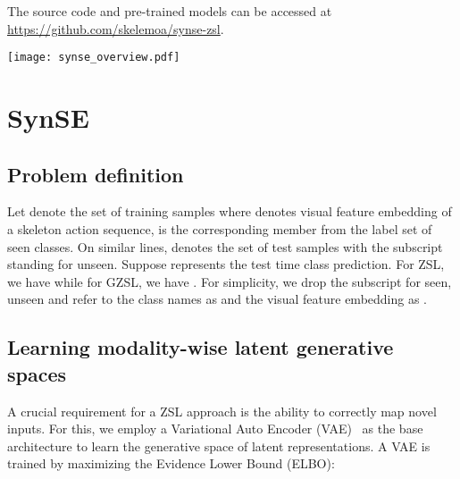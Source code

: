 \documentclass{article}
\begin{document}
The source code and pre-trained models can be accessed at \url{https://github.com/skelemoa/synse-zsl}.

\begin{figure*}[!htb]
\centering
\texttt{[image: synse\_overview.pdf]}
\caption{Architectural diagram for our approach (SynSE). (left) The dotted path represents the process flow for the GZSL setting while the solid arrows represent the flow for ZSL. The Generative Multimodal Alignment Module is detailed on right side. It contains modality VAEs, where Part-of-Speech (PoS) specific latent generative embeddings  (verb),  (noun) are jointly aligned with segments () of latent generative skeleton embedding  via cross-modal alignment - refer Section~\ref{sec:method} for more details. \textit{Note that the RGB images have been included for reference. Only the skeleton sequence is provided as input to the network.}}
\label{fig:alignment_module}
\end{figure*}

\section{SynSE}
\label{sec:method}

\subsection{Problem definition}

Let  denote the set of  training samples where  denotes visual feature embedding of a skeleton action sequence,  is the corresponding member from the label set of seen classes. On similar lines,  denotes the set of test samples with the subscript  standing for unseen. Suppose  represents the test time class prediction. For ZSL, we have  while for GZSL, we have . For simplicity, we drop the subscript for seen, unseen and refer to the class names as  and the visual feature embedding as .

\subsection{Learning modality-wise latent generative spaces}

A crucial requirement for a ZSL approach is the ability to correctly map novel inputs. For this, we employ a Variational Auto Encoder (VAE)~\cite{kingma2013auto} as the base architecture to learn the generative space of latent representations. A VAE is trained by maximizing the Evidence Lower Bound (ELBO):
\end{document}
